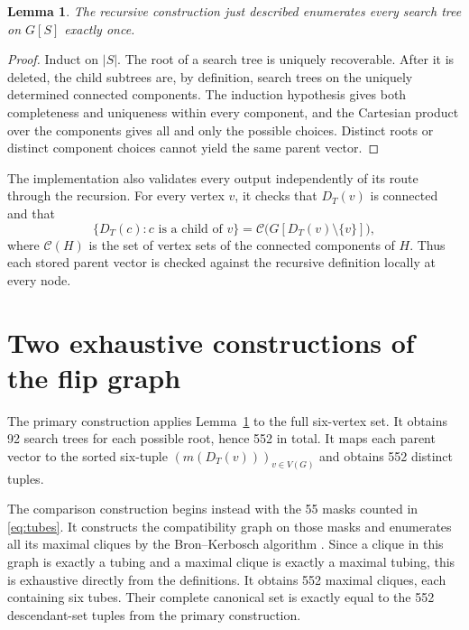 \documentclass[11pt]{article}
\newtheorem{lemma}[theorem]{Lemma}
\newcommand{\cC}{\mathcal{C}}
\begin{document}
\begin{lemma}\label{lem:recursion}
The recursive construction just described enumerates every search tree on
\(G[S]\) exactly once.
\end{lemma}

\begin{proof}
Induct on \(|S|\).  The root of a search tree is uniquely recoverable.  After
it is deleted, the child subtrees are, by definition, search trees on the
uniquely determined connected components.  The induction hypothesis gives
both completeness and uniqueness within every component, and the Cartesian
product over the components gives all and only the possible choices.  Distinct
roots or distinct component choices cannot yield the same parent vector.
\end{proof}

The implementation also validates every output independently of its route
through the recursion.  For every vertex \(v\), it checks that \(D_T(v)\) is
connected and that
\begin{equation}\label{eq:local-check}
 \{D_T(c):c\text{ is a child of }v\}
 =\cC\bigl(G[D_T(v)\setminus\{v\}]\bigr),
\end{equation}
where \(\cC(H)\) is the set of vertex sets of the connected components of
\(H\).  Thus each stored parent vector is checked against the recursive
definition locally at every node.

\section{Two exhaustive constructions of the flip graph}

The primary construction applies Lemma~\ref{lem:recursion} to the full
six-vertex set.  It obtains 92 search trees for each possible root, hence 552
in total.  It maps each parent vector to the sorted six-tuple
\((m(D_T(v)))_{v\in V(G)}\) and obtains 552 distinct tuples.

The comparison construction begins instead with the 55 masks counted in
\eqref{eq:tubes}.  It constructs the compatibility graph on those masks and
enumerates all its maximal cliques by the Bron--Kerbosch algorithm
\cite{BronKerbosch1973}.  Since a clique in this graph is exactly a tubing and
a maximal clique is exactly a maximal tubing, this is exhaustive directly
from the definitions.  It obtains 552 maximal cliques, each containing six
tubes.  Their complete canonical set is exactly equal to the 552 descendant-set
tuples from the primary construction.
\end{document}

